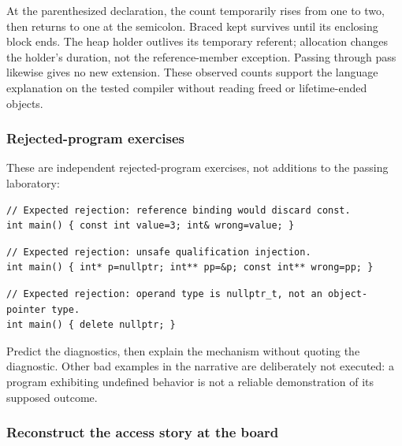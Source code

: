 At the parenthesized declaration, the count temporarily rises from one to two, then returns to one at the semicolon. Braced kept survives until its enclosing block ends. The heap holder outlives its temporary referent; allocation changes the holder's duration, not the reference-member exception. Passing through pass likewise gives no new extension. These observed counts support the language explanation on the tested compiler without reading freed or lifetime-ended objects.

\subsubsection{Rejected-program exercises}\label{rejected-program-exercises}

These are independent rejected-program exercises, not additions to the passing laboratory:

\begin{verbatim}
// Expected rejection: reference binding would discard const.
int main() { const int value=3; int& wrong=value; }
\end{verbatim}

\begin{verbatim}
// Expected rejection: unsafe qualification injection.
int main() { int* p=nullptr; int** pp=&p; const int** wrong=pp; }
\end{verbatim}

\begin{verbatim}
// Expected rejection: operand type is nullptr_t, not an object-pointer type.
int main() { delete nullptr; }
\end{verbatim}

Predict the diagnostics, then explain the mechanism without quoting the diagnostic. Other bad examples in the narrative are deliberately not executed: a program exhibiting undefined behavior is not a reliable demonstration of its supposed outcome.

\subsubsection{Reconstruct the access story at the board}\label{reconstruct-the-access-story-at-the-board}

